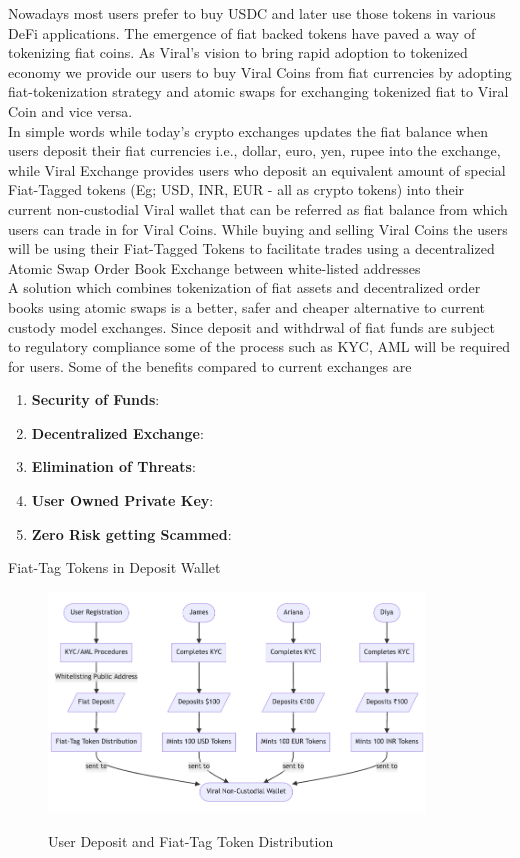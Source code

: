 \documentclass[10pt]{article}
\begin{document}
Nowadays most users prefer to buy USDC and later use those tokens in various DeFi applications. The emergence of fiat backed tokens have paved a way of tokenizing fiat coins. As Viral's vision to bring rapid adoption to tokenized economy we provide our users to buy Viral Coins from fiat currencies by adopting fiat-tokenization strategy and atomic swaps for exchanging tokenized fiat to Viral Coin and vice versa.\\

In simple words while today's crypto exchanges updates the fiat balance when users deposit their fiat currencies i.e., dollar, euro, yen, rupee into the exchange, while Viral Exchange provides users who deposit an equivalent amount of special Fiat-Tagged tokens (Eg; USD, INR, EUR - all as crypto tokens) into their current non-custodial Viral wallet that can be referred as fiat balance from which users can trade in for Viral Coins. While buying and selling Viral Coins the users will be using their Fiat-Tagged Tokens to facilitate trades using a decentralized Atomic Swap Order Book Exchange between white-listed addresses\\

A solution which combines tokenization of fiat assets and decentralized order books using atomic swaps is a better, safer and cheaper alternative to current custody model exchanges. Since deposit and withdrwal of fiat funds are subject to regulatory compliance some of the process such as KYC, AML will be required for users. Some of the benefits compared to current exchanges are
\begin{enumerate}[leftmargin=+0.2in]
\item \textbf{Security of Funds}:
\item \textbf{Decentralized Exchange}:
\item \textbf{Elimination of Threats}:
\item \textbf{User Owned Private Key}:
\item \textbf{Zero Risk getting Scammed}:
\end{enumerate}

Fiat-Tag Tokens in Deposit Wallet\\

\begin{figure}[H]
\begin{center}
\includegraphics[width=10cm]{user-deposit}\\
\caption{User Deposit and Fiat-Tag Token Distribution}
\end{center}
\end{figure}
\end{document}
